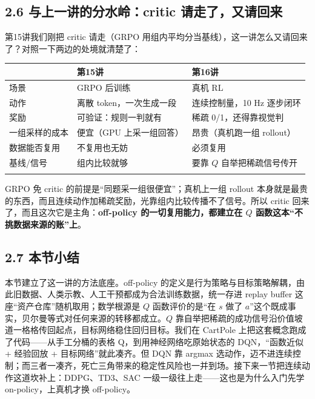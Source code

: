\documentclass[
  chinese,
]{ctexart}
\begin{document}
\subsection{2.6 与上一讲的分水岭：critic
请走了，又请回来}\label{ux4e0eux4e0aux4e00ux8bb2ux7684ux5206ux6c34ux5cadcritic-ux8bf7ux8d70ux4e86ux53c8ux8bf7ux56deux6765}

第15讲我们刚把 critic 请走（GRPO
用组内平均分当基线），这一讲怎么又请回来了？对照一下两边的处境就清楚了：

\begin{center}
\begin{tabular}{@{}>{\raggedright\arraybackslash}p{} >{\raggedright\arraybackslash}p{} >{\raggedright\arraybackslash}p{}@{}}
\toprule\noalign{}
 & 第15讲 & 第16讲 \\
\midrule\noalign{}
场景 & GRPO 后训练 & 真机 RL \\
动作 & 离散 token，一次生成一段 & 连续控制量，10 Hz 逐步闭环 \\
奖励 & 可验证：规则一判就有 & 稀疏 0/1，还得靠视觉判 \\
一组采样的成本 & 便宜（GPU 上采一组回答） & 昂贵（真机跑一组 rollout） \\
数据能否复用 & 不复用也无妨 & 必须复用 \\
基线/信号 & 组内比较就够 & 要靠 \(Q\) 自举把稀疏信号传开 \\
\bottomrule\noalign{}
\end{tabular}
\end{center}

GRPO 免 critic 的前提是``同题采一组很便宜''；真机上一组 rollout
本身就是最贵的东西，而且连续动作加稀疏奖励，光靠组内比较传播不了信号。所以
critic 回来了，而且这次它是主角：\textbf{off-policy
的一切复用能力，都建立在 \(Q\) 函数这本``不挑数据来源的账''上}。

\subsection{2.7 本节小结}\label{ux672cux8282ux5c0fux7ed3-1}

本节建立了这一讲的方法底座。off-policy
的定义是行为策略与目标策略解耦，由此旧数据、人类示教、人工干预都成为合法训练数据，统一存进
replay buffer 这座``资产仓库''随机取用；数学根源是 \(Q\)
函数评价的是``在 \(s\) 做了
\(a\)''这个既成事实，贝尔曼等式对任何来源的转移都成立。\(Q\)
靠自举把稀疏的成功信号沿价值坡道一格格传回起点，目标网络稳住回归目标。我们在
CartPole 上把这套概念跑成了代码------从手工分桶的表格
Q，到用神经网络吃原始状态的 DQN，``函数近似 + 经验回放 +
目标网络''就此凑齐。但 DQN 靠 argmax
选动作，迈不进连续控制；而三者一凑齐，死亡三角带来的稳定性风险也一并到场。接下来一节把连续动作这道坎补上：DDPG、TD3、SAC
一级一级往上走------这也是为什么入门先学 on-policy，上真机才换
off-policy。
\end{document}
